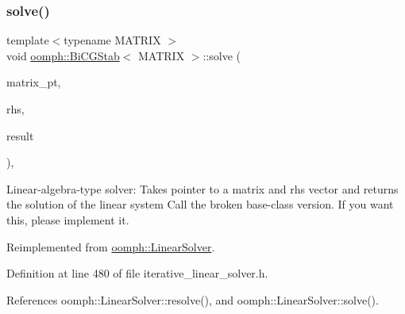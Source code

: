 \mbox{\label{classoomph_1_1BiCGStab_a994915fcd5d99a58472559fdb57807c4}} 
\subsubsection{\texorpdfstring{solve()}{solve()}\hspace{0.1cm}{\footnotesize\ttfamily [3/3]}}
{\footnotesize\ttfamily template$<$typename M\+A\+T\+R\+IX $>$ \\
void \hyperlink{classoomph_1_1BiCGStab}{oomph\+::\+Bi\+C\+G\+Stab}$<$ M\+A\+T\+R\+IX $>$\+::solve (\begin{DoxyParamCaption}\item[{\hyperlink{classoomph_1_1DoubleMatrixBase}{Double\+Matrix\+Base} $\ast$const \&}]{matrix\+\_\+pt,  }\item[{const \hyperlink{classoomph_1_1Vector}{Vector}$<$ double $>$ \&}]{rhs,  }\item[{\hyperlink{classoomph_1_1Vector}{Vector}$<$ double $>$ \&}]{result }\end{DoxyParamCaption})\hspace{0.3cm}{\ttfamily [inline]}, {\ttfamily [virtual]}}



Linear-\/algebra-\/type solver\+: Takes pointer to a matrix and rhs vector and returns the solution of the linear system Call the broken base-\/class version. If you want this, please implement it. 



Reimplemented from \hyperlink{classoomph_1_1LinearSolver_a1f7a2ee2cd18d3dafc20a61ca2f52dbb}{oomph\+::\+Linear\+Solver}.



Definition at line 480 of file iterative\+\_\+linear\+\_\+solver.\+h.



References oomph\+::\+Linear\+Solver\+::resolve(), and oomph\+::\+Linear\+Solver\+::solve().

\mbox{\label{classoomph_1_1BiCGStab_a6e6e49eb139bbc2aedfcb6cd075de3db}} 
